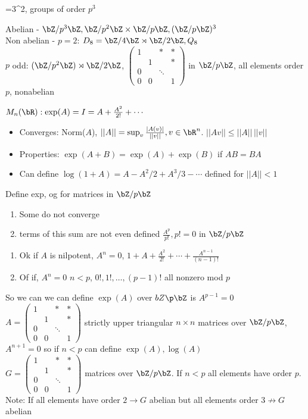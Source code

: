 \noindent
{}=3^2, groups of order $p^3$ 

\begin{example}
    Abelian - $\bZ/p^3\bZ, \bZ/p^2\bZ \times \bZ/p\bZ, (\bZ/p\bZ)^3$ \\
    Non abelian - $p=2$: $D_8 = \bZ/4\bZ \rtimes \bZ/2\bZ, Q_8$ \\
    $p$ odd: $(\bZ/p^2\bZ) \rtimes \bZ/2\bZ$, $\begin{pmatrix} 1 & & * & * \\ & 1 & & * \\ 0 & & \ddots & \\ 0 & 0 & & 1 \end{pmatrix}$ in $\bZ/p\bZ$, all elements order $p$, nonabelian 
\end{example}

\noindent
$M_n(\bR): \exp(A) = I = A + \frac{A^2}{2!} + \cdots$ \\
\begin{itemize}
    \item Converges: Norm($A$), $||A|| = \sup_{v} \frac{|A(v)|}{||v||}, v \in \bR^n$. $||Av|| \le ||A|| \, ||v||$ 
    \item Properties: $\exp(A+B) = \exp(A)+ \exp(B)$ if $AB = BA$ 
    \item Can define $\log(1+A) = A - A^2/2 + A^3/3 - \cdots$ defined for $||A|| < 1$ 
\end{itemize}

\noindent
Define exp, og for matrices in $\bZ/p\bZ$ 
\begin{enumerate}
    \item Some do not converge 
    \item terms of this sum are not even defined $\frac{A^p}{p!}, p! = 0$ in $\bZ/p\bZ$ 
\end{enumerate}
\begin{enumerate}
    \item Ok if $A$ is nilpotent, $A^n=0$, $1 + A + \frac{A^2}{2!} + \cdots + \frac{A^{n-1}}{(n-1)!}$ 
    \item Of if, $A^n=0$ $n < p$, $0!, 1!, \ldots, (p-1)!$ all nonzero mod $p$ 
\end{enumerate}
So we can we can define $\exp(A)$ over $bZ\p\bZ$ is $A^{p-1}=0$ \\
$A = \begin{pmatrix} 1 & & * & * \\ & 1 & & * \\ 0 & & \ddots & \\ 0 & 0 & & 1 \end{pmatrix}$ strictly upper triangular $n \times n$ matrices over $\bZ/p\bZ$, $A^{n+1}=0$ so if $n < p$ can define $\exp(A), \log(A)$ \\
$G = \begin{pmatrix} 1 & & * & * \\ & 1 & & * \\ 0 & & \ddots & \\ 0 & 0 & & 1 \end{pmatrix}$ matrices over $\bZ/p\bZ$. If $n<p$ all elements have order $p$. \\
Note: If all elements have order $2 \to G$ abelian but all elements order $3 \not\to G$ abelian  